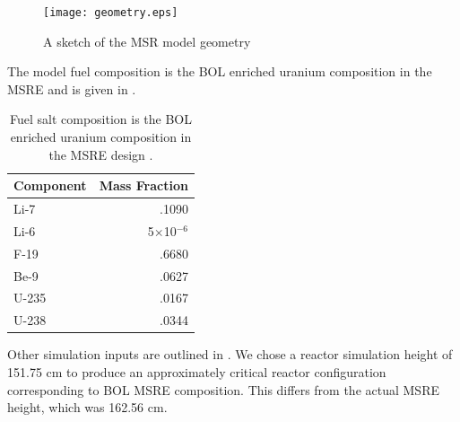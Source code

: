 \documentclass{article}
\begin{document}
\begin{figure}[htpb]
  \centering
  \texttt{[image: geometry.eps]}
  \label{fig:geom}
  \caption{A sketch of the \gls{MSR} model geometry}
\end{figure}


The model fuel composition is the \gls{BOL} enriched uranium composition in the
\gls{MSRE} and is given in  \cite{robertson_msre_1965}.


\begin{table}[htpb]
  \begin{center}
    \begin{tabular}{l | r}
      Component & Mass Fraction\\\hline\hline
      Li-7 & .1090\\
      Li-6 & 5$\times$10$^{-6}$\\
      F-19 & .6680\\
      Be-9 & .0627\\
      U-235 & .0167\\
      U-238 & .0344\\
    \end{tabular}
  \end{center}
        \caption{Fuel salt composition is the \gls{BOL} enriched
        uranium composition in the \gls{MSRE} design
        \cite{robertson_msre_1965}.}
  \label{table:comp}
\end{table}

Other simulation inputs are outlined in .
We chose a reactor simulation height of 151.75 cm to produce an
approximately critical reactor configuration corresponding to \gls{BOL}
\gls{MSRE} composition. This differs from the actual \gls{MSRE} height, which
was 162.56 cm.
\end{document}

